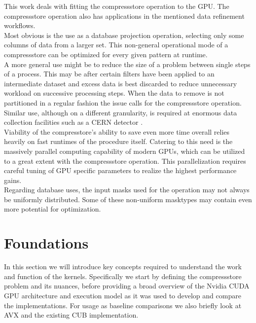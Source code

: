 \documentclass{tudscrreprt}
\begin{document}
		This work deals with fitting the compressstore operation to the GPU. The compressstore operation also has applications in the mentioned data refinement workflows. \\
		Most obvious is the use as a database projection operation, selecting only some columns of data from a larger set. This non-general operational mode of a compressstore can be optimized for every given pattern at runtime. \\
		A more general use might be to reduce the size of a problem between single steps of a process. This may be after certain filters have been applied to an intermediate dataset and excess data is best discarded to reduce unnecessary workload on successive processing steps. When the data to remove is not partitioned in a regular fashion the issue calls for the compressstore operation. \\
		Similar use, although on a different granularity, is required at enormous data collection facilities such as a CERN detector \cite{cern_datastreaming}. \\
		
		Viability of the compresstore's ability to save even more time overall relies heavily on fast runtimes of the procedure itself. Catering to this need is the massively parallel computing capability of modern GPUs, which can be utilized to a great extent with the compressstore operation. This parallelization requires careful tuning of GPU specific parameters to realize the highest performance gains. \\
		
		Regarding database uses, the input masks used for the operation may not always be uniformly distributed. Some of these non-uniform masktypes may contain even more potential for optimization. \\
		
	\chapter{Foundations}
		In this section we will introduce key concepts required to understand the work and function of the kernels. Specifically we start by defining the compressstore problem and its nuances, before providing a broad overview of the Nvidia CUDA GPU architecture and execution model as it was used to develop and compare the implementations. For usage as baseline comparisons we also briefly look at AVX and the existing CUB implementation.
	
\end{document}
